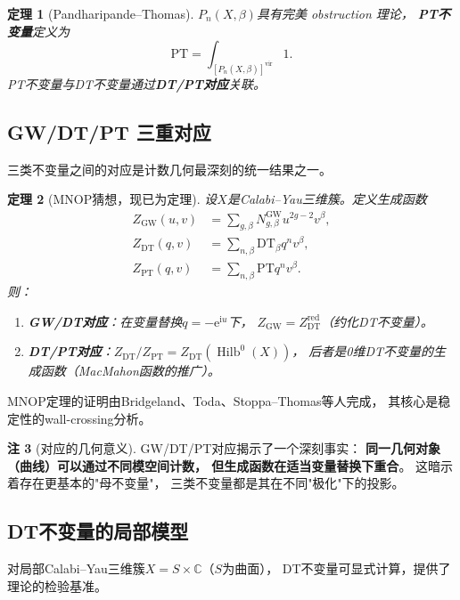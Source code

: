 \documentclass[11pt,a4paper]{article}
\theoremstyle{plain}
\newtheorem{theorem}{定理}[section]
\theoremstyle{definition}
\newtheorem{remark}[theorem]{注}
\newcommand{\C}{\mathbb{C}}
\newcommand{\ee}{\mathrm{e}}
\newcommand{\ii}{\mathrm{i}}
\newcommand{\Hilb}{\operatorname{Hilb}}
\newcommand{\GW}{\mathrm{GW}}
\newcommand{\DT}{\mathrm{DT}}
\newcommand{\PT}{\mathrm{PT}}
\newcommand{\GWinv}{N^{\mathrm{GW}}}
\newcommand{\DTinv}{\mathrm{DT}}
\newcommand{\PTinv}{\mathrm{PT}}
\begin{document}
\begin{theorem}[Pandharipande--Thomas]\label{thm:pt}
$P_n(X, \beta)$具有完美 obstruction 理论，
\textbf{PT不变量}定义为
\[
\PTinv = \int_{[P_n(X,\beta)]^{\mathrm{vir}}} 1.
\]
PT不变量与DT不变量通过\textbf{DT/PT对应}关联。
\end{theorem}

\subsection{GW/DT/PT 三重对应}

三类不变量之间的对应是计数几何最深刻的统一结果之一。

\begin{theorem}[MNOP猜想，现已为定理]\label{thm:mnop}
设$X$是Calabi--Yau三维簇。定义生成函数
\begin{align*}
Z_{\GW}(u, v) &= \sum_{g, \beta} \GWinv_{g, \beta} u^{2g-2} v^\beta, \\
Z_{\DT}(q, v) &= \sum_{n, \beta} \DTinv_\beta q^n v^\beta, \\
Z_{\PT}(q, v) &= \sum_{n, \beta} \PTinv q^n v^\beta.
\end{align*}
则：
\begin{enumerate}[label=(\arabic*)]
\item \textbf{GW/DT对应}：在变量替换$q = -\ee^{\ii u}$下，
$Z_{\GW} = Z_{\DT}^{\mathrm{red}}$（约化DT不变量）。
\item \textbf{DT/PT对应}：$Z_{\DT} / Z_{\PT} = Z_{\DT}(\Hilb^0(X))$，
后者是0维DT不变量的生成函数（MacMahon函数的推广）。
\end{enumerate}
\end{theorem}

MNOP定理的证明由Bridgeland、Toda、Stoppa--Thomas等人完成，
其核心是稳定性的wall-crossing分析。

\begin{remark}[对应的几何意义]\label{rmk:correspondence}
GW/DT/PT对应揭示了一个深刻事实：
\textbf{同一几何对象（曲线）可以通过不同模空间计数，
但生成函数在适当变量替换下重合}。
这暗示着存在更基本的"母不变量"，
三类不变量都是其在不同"极化"下的投影。
\end{remark}

\subsection{DT不变量的局部模型}

对局部Calabi--Yau三维簇$X = S \times \C$（$S$为曲面），
DT不变量可显式计算，提供了理论的检验基准。
\end{document}
